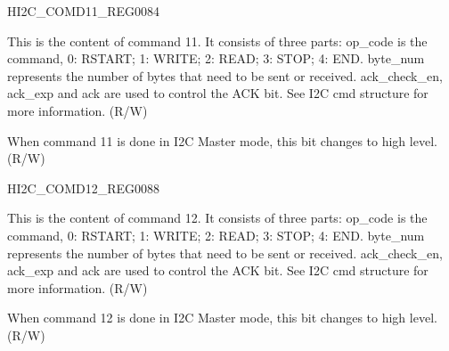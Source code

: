 \begin{register}{H}{I2C\_COMD11\_REG}{\hexprefix{}0084}\label{regdesc:I2CCOMD11REG}
%
%
%
\regnewline%
\begin{regdesc}\begin{reglist}
\label{fielddesc:I2CCOMMAND11}\item [I2C\_COMMAND11] This is the content of command 11. It consists of three parts:
op\_code is the command, 0: RSTART; 1: WRITE; 2: READ; 3: STOP; 4: END.
byte\_num represents the number of bytes that need to be sent or received.
ack\_check\_en, ack\_exp and ack are used to control the ACK bit. See I2C cmd structure for more information. (R/W)
\label{fielddesc:I2CCOMMAND11DONE}\item [I2C\_COMMAND11\_DONE] When command 11 is done in I2C Master mode, this bit changes to high level. (R/W)
\end{reglist}\end{regdesc}
\end{register}


\begin{register}{H}{I2C\_COMD12\_REG}{\hexprefix{}0088}\label{regdesc:I2CCOMD12REG}
%
%
%
\regnewline%
\begin{regdesc}\begin{reglist}
\label{fielddesc:I2CCOMMAND12}\item [I2C\_COMMAND12] This is the content of command 12. It consists of three parts:
op\_code is the command, 0: RSTART; 1: WRITE; 2: READ; 3: STOP; 4: END.
byte\_num represents the number of bytes that need to be sent or received.
ack\_check\_en, ack\_exp and ack are used to control the ACK bit. See I2C cmd structure for more information. (R/W)
\label{fielddesc:I2CCOMMAND12DONE}\item [I2C\_COMMAND12\_DONE] When command 12 is done in I2C Master mode, this bit changes to high level. (R/W)
\end{reglist}\end{regdesc}
\end{register}


